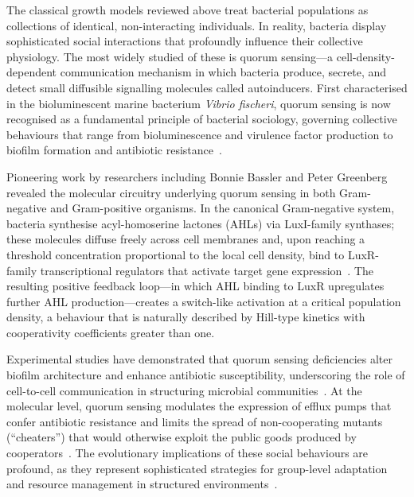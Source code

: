 \documentclass[14pt,a4paper,openany]{extbook}
\begin{document}
The classical growth models reviewed above treat bacterial populations as collections of identical, non-interacting individuals. In reality, bacteria display sophisticated social interactions that profoundly influence their collective physiology. The most widely studied of these is quorum sensing---a cell-density-dependent communication mechanism in which bacteria produce, secrete, and detect small diffusible signalling molecules called autoinducers. First characterised in the bioluminescent marine bacterium \textit{Vibrio fischeri}, quorum sensing is now recognised as a fundamental principle of bacterial sociology, governing collective behaviours that range from bioluminescence and virulence factor production to biofilm formation and antibiotic resistance~\cite{mukherjee2019bacterial, west2006social}.

Pioneering work by researchers including Bonnie Bassler and Peter Greenberg revealed the molecular circuitry underlying quorum sensing in both Gram-negative and Gram-positive organisms. In the canonical Gram-negative system, bacteria synthesise acyl-homoserine lactones (AHLs) via LuxI-family synthases; these molecules diffuse freely across cell membranes and, upon reaching a threshold concentration proportional to the local cell density, bind to LuxR-family transcriptional regulators that activate target gene expression~\cite{miller2001, kuttler2017reaction}. The resulting positive feedback loop---in which AHL binding to LuxR upregulates further AHL production---creates a switch-like activation at a critical population density, a behaviour that is naturally described by Hill-type kinetics with cooperativity coefficients greater than one.

Experimental studies have demonstrated that quorum sensing deficiencies alter biofilm architecture and enhance antibiotic susceptibility, underscoring the role of cell-to-cell communication in structuring microbial communities~\cite{haidar2024}. At the molecular level, quorum sensing modulates the expression of efflux pumps that confer antibiotic resistance and limits the spread of non-cooperating mutants (``cheaters'') that would otherwise exploit the public goods produced by cooperators~\cite{evans2018}. The evolutionary implications of these social behaviours are profound, as they represent sophisticated strategies for group-level adaptation and resource management in structured environments~\cite{west2006social}.
\end{document}
